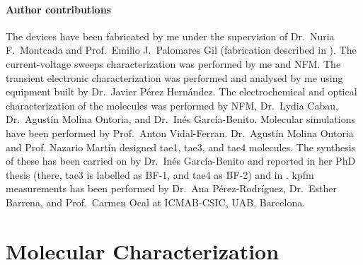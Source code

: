 \paragraph{Author contributions}
The devices have been fabricated by me under the supervision of Dr.\ Nuria F.\ Montcada and Prof.\ Emilio J.\ Palomares Gil (fabrication described in ).
The current\hyp{}voltage sweeps characterization was performed by me and NFM.
The transient electronic characterization was performed and analysed by me using equipment built by Dr.\ Javier Pérez Hernández.
The electrochemical and optical characterization of the molecules was performed by NFM, Dr.\ Lydia Cabau, Dr.\ Agustín Molina Ontoria, and Dr.\ Inés García\hyp{}Benito.
Molecular simulations have been performed by Prof.\ Anton Vidal\hyp{}Ferran.
Dr.\ Agustín Molina Ontoria and Prof. Nazario Martín designed \gls{tae1}, \gls{tae3}, and \gls{tae4} molecules.
The synthesis of these has been carried on by Dr.\ Inés García\hyp{}Benito and reported in her PhD thesis \cite{Garcia-Benito2017} (there, \gls{tae3} is labelled as BF-1, and \gls{tae4} as BF-2) and in \cite{Gelmetti2019}.
\Gls{kpfm} measurements has been performed by Dr.\ Ana Pérez-Rodríguez, Dr.\ Esther Barrena, and Prof.\ Carmen Ocal at ICMAB-CSIC, UAB, Barcelona.


%

%
%
\section{Molecular Characterization}

